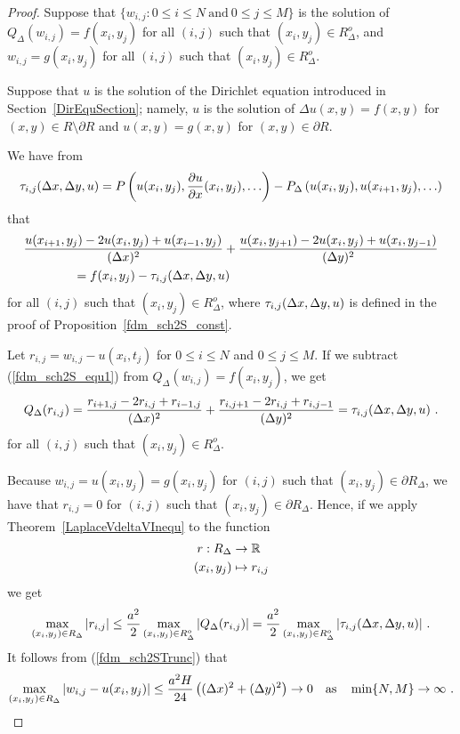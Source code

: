 \begin{proof}
Suppose that
$\{ w_{i,j} : 0 \leq i \leq N \ \text{and} \ 0 \leq j \leq M \}$
is the solution of $Q_\Delta(w_{i,j}) = f(x_i,y_j)$ for all
$(i,j)$ such that $(x_i,y_j) \in R^o_\Delta$, and
$w_{i,j} = g(x_i,y_j)$ for all $(i,j)$ such that $(x_i,y_j) \in R^o_\Delta$.

Suppose that $u$ is the solution of the Dirichlet equation introduced
in Section~\ref{DirEquSection}; namely, $u$ is the solution of
$\Delta u(x,y)=f(x,y)$ for $(x,y) \in R \setminus \partial R$ and
$u(x,y) = g(x,y)$ for $(x,y) \in \partial R$.

We have from
\[
\tau_{i,j}(\Delta{x},\Delta{y},u)
= P\left(u(x_i,y_j) , \frac{\partial{u}}{\partial{x}}(x_i,y_j), \ldots\right)
- P_\Delta\left(u(x_i,y_j) , u(x_{i+1},y_j), \ldots\right)
\]
that
\begin{equation} \label{fdm_sch2S_equ1}
\begin{split}
&\frac{u(x_{i+1},y_j) - 2u(x_i,y_j) + u(x_{i-1},y_j)}{(\Delta{x})^2}
+ \frac{u(x_i,y_{j+1}) - 2u(x_i,y_j) + u(x_i,y_{j-1})}{(\Delta{y})^2} \\
&\qquad\qquad = f(x_i,y_j) - \tau_{i,j}(\Delta{x},\Delta{y},u)
\end{split}
\end{equation}
for all $(i,j)$ such that $(x_i,y_j) \in R^o_\Delta$, where
$\tau_{i,j}(\Delta{x},\Delta{y},u)$ is defined in the proof of
Proposition~\ref{fdm_sch2S_const}.

Let $r_{i,j} = w_{i,j} - u(x_i,t_j)$ for $0\leq i \leq N$ and
$0 \leq j \leq M$.  If we subtract (\ref{fdm_sch2S_equ1}) from
$Q_\Delta(w_{i,j}) = f(x_i,y_j)$, we get
\[
Q_\Delta(r_{i,j}) =
\frac{r_{i+1,j} - 2r_{i,j} + r_{i-1,j}}{(\Delta{x})^2}
+ \frac{r_{i,j+1} - 2r_{i,j} + r_{i,j-1}}{(\Delta{y})^2} =
\tau_{i,j}(\Delta{x},\Delta{y},u) \ .
\]
for all $(i,j)$ such that $(x_i,y_j) \in R^o_\Delta$.

Because $w_{i,j} = u(x_i,y_j) = g(x_i,y_j)$ for $(i,j)$ such that
$(x_i,y_j) \in \partial R_\Delta$, we have that
$r_{i,j} = 0$ for $(i,j)$ such that
$(x_i,y_j) \in \partial R_\Delta$.  Hence, if we apply
Theorem~\ref{LaplaceVdeltaVInequ} to the function
\begin{align*}
  r : R_\Delta & \to \mathbb{R} \\
  (x_i,y_j) & \mapsto r_{i,j}
\end{align*}
we get
\[
\max_{(x_i,y_j) \in R_\Delta} |r_{i,j}|
\leq \frac{a^2}{2} \max_{(x_i,y_j) \in R^o_\Delta}
\left|Q_\Delta(r_{i,j})\right|
= \frac{a^2}{2}
\max_{(x_i,y_j) \in R^o_\Delta} |\tau_{i,j}(\dtx{x},\dtx{y},u)| \ .
\]
It follows from (\ref{fdm_sch2STrunc}) that
\[
\max_{(x_i,y_j) \in R_\Delta} |w_{i,j}-u(x_i,y_j)|
\leq \frac{a^2H}{24} \left( (\dtx{x})^2 + (\dtx{y})^2\right)
\to 0
\quad \text{as} \quad \min\{N,M\} \to \infty \ .  \qedhere
\]
\end{proof}


